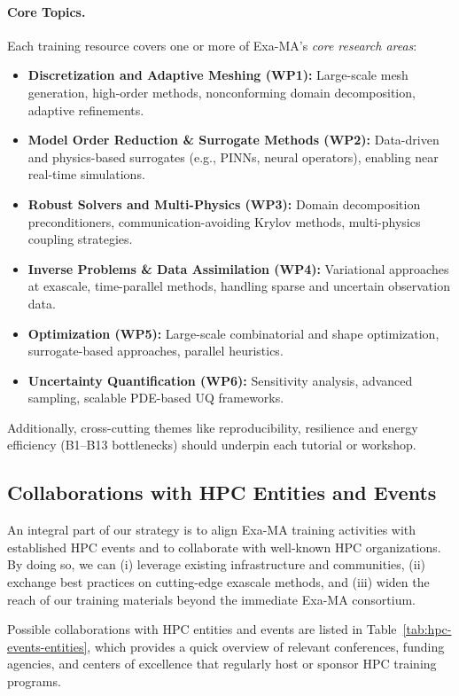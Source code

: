 \paragraph{Core Topics.}
Each training resource covers one or more of Exa-MA’s \textit{core research areas}:
\begin{itemize}
    \item \textbf{Discretization and Adaptive Meshing (WP1):}
    Large-scale mesh generation, high-order methods, nonconforming domain decomposition, adaptive refinements.
    \item \textbf{Model Order Reduction \& Surrogate Methods (WP2):}
    Data-driven and physics-based surrogates (e.g., PINNs, neural operators), enabling near real-time simulations.
    \item \textbf{Robust Solvers and Multi-Physics (WP3):}
    Domain decomposition preconditioners, communication-avoiding Krylov methods, multi-physics coupling strategies.
    \item \textbf{Inverse Problems \& Data Assimilation (WP4):}
    Variational approaches at exascale, time-parallel methods, handling sparse and uncertain observation data.
    \item \textbf{Optimization (WP5):}
    Large-scale combinatorial and shape optimization, surrogate-based approaches, parallel heuristics.
    \item \textbf{Uncertainty Quantification (WP6):}
    Sensitivity analysis, advanced sampling, scalable PDE-based UQ frameworks.
\end{itemize}
Additionally, cross-cutting themes like reproducibility, resilience and energy efficiency (B1--B13 bottlenecks) should underpin each tutorial or workshop. 

\subsection{Collaborations with HPC Entities and Events}

An integral part of our strategy is to align Exa-MA training activities with established HPC events and to collaborate with well-known HPC organizations. 
By doing so, we can (i) leverage existing infrastructure and communities, 
(ii) exchange best practices on cutting-edge exascale methods, 
and (iii) widen the reach of our training materials beyond the immediate Exa-MA consortium. 

Possible collaborations with HPC entities and events are listed in Table~\ref{tab:hpc-events-entities}, which provides a quick overview of relevant conferences, funding agencies, and centers of excellence that regularly host or sponsor HPC training programs.




